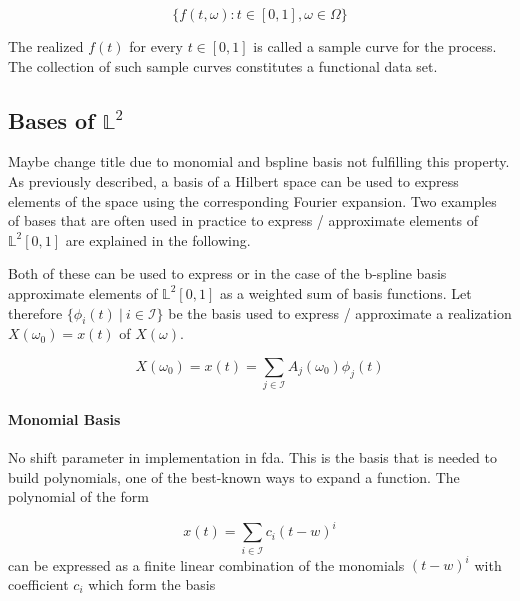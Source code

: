 \documentclass[11pt,twoside,a4paper]{article}
\begin{document}
	
	\begin{equation}
	\{f(t,\omega) : t \in [0, 1], \omega \in \Omega\}
	\end{equation}
	
	The realized $f(t)$ for every $t \in [0,1]$ is called a sample curve for the process. The collection of such sample curves constitutes a functional data set.
	
	\subsection{Bases of $\mathbb{L}^2$} 
	{\color{red} Maybe change title due to monomial and bspline basis not fulfilling this property.}
	As previously described, a basis of a Hilbert space can be used to express elements of the space using the corresponding Fourier expansion. Two examples of bases that are often used in practice to express / approximate elements of $\mathbb{L}^2[0,1]$  are explained in the following.
	
	Both of these can be used to express or in the case of the b-spline basis approximate elements of $\mathbb{L}^2[0,1]$ as a weighted sum of basis functions. Let therefore $\{\phi_i(t) \: \vert \: i \in \mathcal{I}\}$ be the basis used to express / approximate a realization $X(\omega_0) = x(t)$ of $X(\omega)$.
	
	\begin{equation}
		X(\omega_0) = x(t) = \sum_{j \in \mathcal{I}} A_{j}(\omega_0) \phi_j(t)
	\end{equation}
	
	\paragraph{Monomial Basis}
	{\color{red} No shift parameter in implementation in fda.}
This is the basis that is needed to build polynomials, one of the best-known ways to expand a function.
The polynomial of the form 

	\begin{equation}
		x(t) = \sum_{i \in \mathcal{I}} c_i(t -w)^{i}
	\end{equation}
	can be expressed as a finite linear combination of the monomials $(t - w)^{i}$ with coefficient $c_i$ which form the basis 
	
\end{document}
